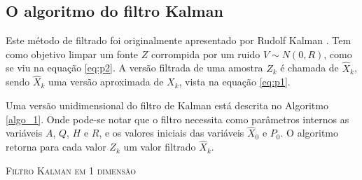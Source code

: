 \documentclass[a4paper,10pt]{article}
\begin{document}
\subsection{O algoritmo do filtro Kalman}\label{subsec:Kalman}
Este método de filtrado foi originalmente apresentado por Rudolf Kalman \cite{citeulike:347166}. 
Tem como objetivo limpar um fonte $Z$ corrompida por um ruido $V \sim N(0,R)$, 
como se viu na equação \eqref{eq:p2}. A versão filtrada de uma amostra
$Z_k$ é chamada de $\hat{X}_k$, sendo $\hat{X}_k$ uma versão aproximada de $X_k$, vista na
equação \eqref{eq:p1}.

Uma versão unidimensional do filtro de Kalman está descrita no Algoritmo \ref{algo_1}. Onde pode-se 
notar que o filtro necessita como parâmetros internos as variáveis $A$, $Q$, $H$ e $R$,
e os valores iniciais das variáveis $\hat{X}_0$ e $P_0$. O algoritmo retorna para cada valor $Z_k$ 
 um valor filtrado $\hat{X}_k$.


\begin{algorithm}[H]   \label{algo_1}
   \SetAlgoLined


   \caption{\textsc{Filtro Kalman em 1 dimensão}}
\end{algorithm}
\end{document}
